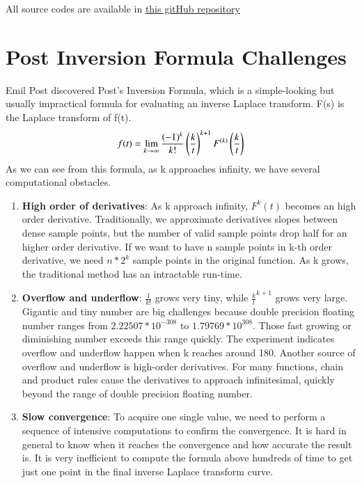 \documentclass[12pt]{article}
\begin{document}
All source codes are available in 
\href{https://github.com/fredzqm/laplace}{this gitHub repository}



\section{Post Inversion Formula Challenges}

Emil Post discovered Post's Inversion Formula, which is a simple-looking but usually impractical formula for evaluating an inverse Laplace transform. F(s) is the Laplace transform of f(t).
\begin{equation*}
f(t) = \lim_{k \rightarrow \infty}\frac{(-1)^{k}}{k!} \left(\frac{k}{t}\right)^{k+1}  F^{(k)} \left(\frac{k}{t}\right)
\end{equation*}
As we can see from this formula, as k approaches infinity, we have several computational obstacles. 
\begin{enumerate}
\item
	\textbf{High order of derivatives}: As k approach infinity, $F^k(t)$ becomes an high order derivative. Traditionally, we approximate derivatives slopes between dense sample points, but the number of valid sample points drop half for an higher order derivative. If we want to have n sample points in k-th order derivative, we need $n*2^{k}$ sample points in the original function. As k grows, the traditional method has an intractable run-time.

\item 
	\textbf{Overflow and underflow}: $\frac{1}{k!}$ grows very tiny, while $\frac{k}{t}^{k+1}$ grows very large. Gigantic and tiny number are big challenges because double precision floating number ranges from $2.22507*10^{-308}$ to  $1.79769*10^{308}$. Those fast growing or diminishing number exceeds this range quickly. The experiment indicates overflow and underflow happen when k reaches around 180.
	Another source of overflow and underflow is high-order derivatives. For many functions, chain and product rules cause the derivatives to approach infinitesimal, quickly beyond the range of double precision floating number.

\item
 	\textbf{Slow convergence}: To acquire one single value, we need to perform a sequence of intensive computations to confirm the convergence. It is hard in general to know when it reaches the convergence and how accurate the result is. It is very inefficient to compute the formula above hundreds of time to get just one point in the final inverse Laplace transform curve.
\end{enumerate}
\end{document}

